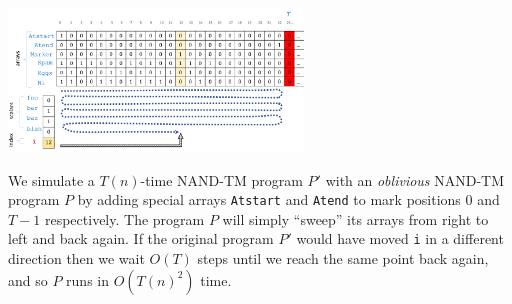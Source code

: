 \begin{marginfigure}
\centering
\includegraphics[width=\linewidth, height=1.5in, keepaspectratio]{../figure/obliviousnandtm.png}
\caption{We simulate a \(T(n)\)-time NAND-TM program \(P'\) with an
\emph{oblivious} NAND-TM program \(P\) by adding special arrays
\texttt{Atstart} and \texttt{Atend} to mark positions \(0\) and \(T-1\)
respectively. The program \(P\) will simply ``sweep'' its arrays from
right to left and back again. If the original program \(P'\) would have
moved \texttt{i} in a different direction then we wait \(O(T)\) steps
until we reach the same point back again, and so \(P\) runs in
\(O(T(n)^2)\) time.}
\label{obliviousnandtmfig}
\end{marginfigure}

